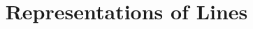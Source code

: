 \documentclass{ximera}
\title{Representations of Lines}
\begin{document}
  
\begin{abstract}  
\end{abstract}  
\maketitle 
\end{document}
